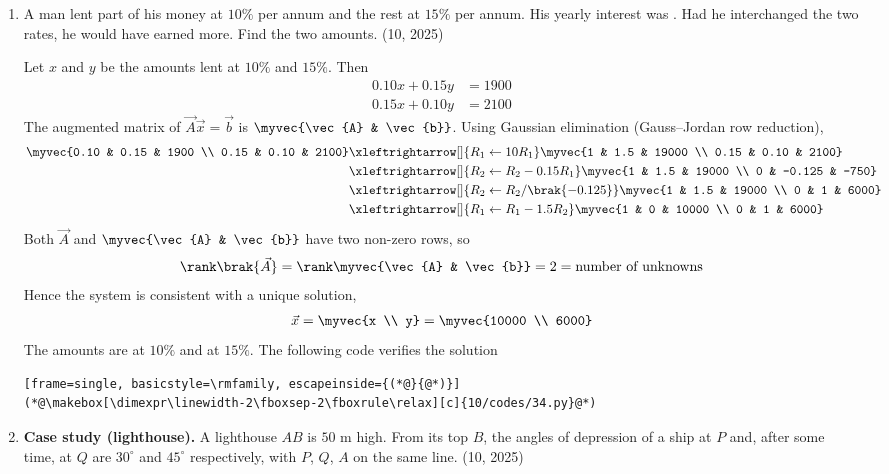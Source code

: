 \begin{enumerate}[label=\thesubsection.\arabic*, ref=\thesubsection.\theenumi]
\item
A man lent part of his money at $10\%$ per annum and the rest at $15\%$ per annum. His yearly interest was . Had he interchanged the two rates, he would have earned  more. Find the two amounts.
\hfill (10, 2025)

\solution
Let $x$ and $y$ be the amounts lent at $10\%$ and $15\%$. Then
\begin{align}
	0.10x + 0.15y &= 1900 \\
	0.15x + 0.10y &= 2100
\end{align}
The augmented matrix of $\vec{A}\vec{x} = \vec{b}$ is $\myvec{\vec{A} & \vec{b}}$. Using Gaussian elimination (Gauss--Jordan row reduction),
\begin{align}
	\myvec{0.10 & 0.15 & 1900 \\ 0.15 & 0.10 & 2100}
	&\xleftrightarrow[]{R_1 \leftarrow 10R_1}
	\myvec{1 & 1.5 & 19000 \\ 0.15 & 0.10 & 2100}
	\\
	&\xleftrightarrow[]{R_2 \leftarrow R_2 - 0.15R_1}
	\myvec{1 & 1.5 & 19000 \\ 0 & -0.125 & -750}
	\\
	&\xleftrightarrow[]{R_2 \leftarrow R_2/\brak{-0.125}}
	\myvec{1 & 1.5 & 19000 \\ 0 & 1 & 6000}
	\\
	&\xleftrightarrow[]{R_1 \leftarrow R_1 - 1.5R_2}
	\myvec{1 & 0 & 10000 \\ 0 & 1 & 6000}
\end{align}
Both $\vec{A}$ and $\myvec{\vec{A} & \vec{b}}$ have two non-zero rows, so
\begin{align}
	\rank\brak{\vec{A}} = \rank\myvec{\vec{A} & \vec{b}} = 2 = \text{number of unknowns}
\end{align}
Hence the system is consistent with a unique solution,
\begin{align}
	\vec{x} = \myvec{x \\ y} = \myvec{10000 \\ 6000}
\end{align}
The amounts are  at $10\%$ and  at $15\%$. The following code verifies the solution
\begin{lstlisting}[frame=single, basicstyle=\rmfamily, escapeinside={(*@}{@*)}]
(*@\makebox[\dimexpr\linewidth-2\fboxsep-2\fboxrule\relax][c]{10/codes/34.py}@*)
\end{lstlisting}

\item
\textbf{Case study (lighthouse).} A lighthouse $AB$ is $50$ m high. From its top $B$, the angles of depression of a ship at $P$ and, after some time, at $Q$ are $30^\circ$ and $45^\circ$ respectively, with $P$, $Q$, $A$ on the same line.
\hfill (10, 2025)



\end{enumerate}
